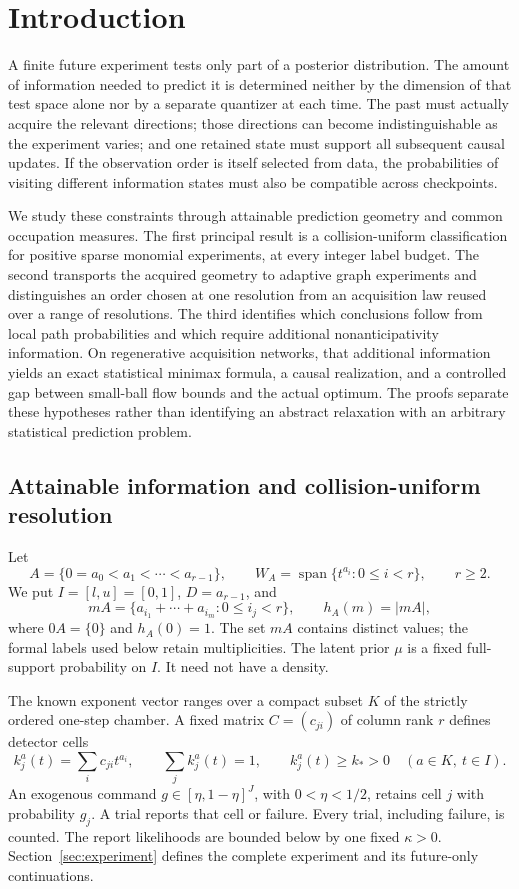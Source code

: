 \section{Introduction}
A finite future experiment tests only part of a posterior distribution.
The amount of information needed to predict it is determined neither by
the dimension of that test space alone nor by a separate quantizer at
each time. The past must actually acquire the relevant directions; those
directions can become indistinguishable as the experiment varies; and
one retained state must support all subsequent causal updates. If the
observation order is itself selected from data, the probabilities of
visiting different information states must also be compatible across
checkpoints.

We study these constraints through attainable prediction geometry and
common occupation measures. The first principal result is a
collision-uniform classification for positive sparse monomial
experiments, at every integer label budget. The second transports the
acquired geometry to adaptive graph experiments and distinguishes an
order chosen at one resolution from an acquisition law reused over a
range of resolutions. The third identifies which conclusions follow
from local path probabilities and which require additional
nonanticipativity information. On regenerative acquisition networks,
that additional information yields an exact statistical minimax formula,
a causal realization, and a controlled gap between small-ball flow
bounds and the actual optimum. The proofs separate these hypotheses
rather than identifying an abstract relaxation with an arbitrary
statistical prediction problem.

\subsection{Attainable information and collision-uniform resolution}
Let
\[
 A=\{0=a_0<a_1<\cdots<a_{r-1}\},\qquad
 W_A=\operatorname{span}\{t^{a_i}:0\le i<r\},\qquad r\ge2.
\]
We put $I=[l,u]=[0,1]$, $D=a_{r-1}$, and
\[
 mA=\{a_{i_1}+\cdots+a_{i_m}:0\le i_j<r\},\qquad
 h_A(m)=|mA|,
\]
where $0A=\{0\}$ and $h_A(0)=1$. The set $mA$ contains distinct
values; the formal labels used below retain multiplicities. The latent
prior $\mu$ is a fixed full-support probability on $I$. It need not
have a density.

The known exponent vector ranges over a compact subset $K$ of the
strictly ordered one-step chamber. A fixed matrix $C=(c_{ji})$ of
column rank $r$ defines detector cells
\[
 k_j^a(t)=\sum_i c_{ji}t^{a_i},\qquad
 \sum_j k_j^a(t)=1,\qquad k_j^a(t)\ge k_*>0
                  \quad(a\in K,\ t\in I).
\]
An exogenous command $g\in[\eta,1-\eta]^J$, with $0<\eta<1/2$,
retains cell $j$ with probability $g_j$. A trial reports that cell or
failure. Every trial, including failure, is counted. The report
likelihoods are bounded below by one fixed $\kappa>0$.
Section~\ref{sec:experiment}
defines the complete experiment and its future-only continuations.

